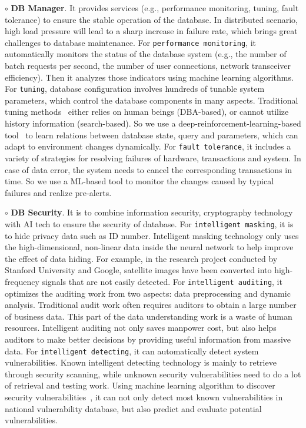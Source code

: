 $\circ$ \textbf{DB Manager}. It provides services (e.g., performance monitoring, tuning, fault tolerance) to ensure the stable operation of the database. In distributed scenario, high load pressure will lead to a sharp increase in failure rate, which brings great challenges to database maintenance. 
For \texttt{performance monitoring}, it automatically monitors the status of the database system (e.g., the number of batch requests per second, the number of user connections, network transceiver efficiency). Then it analyzes those indicators using machine learning algorithms. 
For \texttt{tuning}, database configuration involves hundreds of tunable system parameters, which control the database components in many aspects. Traditional tuning methods~\cite{DBLP:journals/pvldb/DuanTB09, DBLP:conf/cloud/ZhuLGBMLSY17} either relies on human beings (DBA-based), or cannot utilize history information (search-based). So we use a deep-reinforcement-learning-based tool~\cite{DBLP:conf/vldb/qtune19} to learn relations between database state, query and parameters, which can adapt to environment changes dynamically.
For \texttt{fault tolerance}, it includes a variety of strategies for resolving failures of hardware, transactions and system. In case of data error, the system needs to cancel the corresponding transactions in time. So we use a ML-based tool to monitor the changes caused by typical failures and realize pre-alerts. 

$\circ$ \textbf{DB Security}. It is to combine information security, cryptography technology with AI tech to  ensure the security of database. 
For \texttt{intelligent masking}, it is to hide privacy data such as ID number.  Intelligent masking technology only uses the high-dimensional, non-linear data inside the neural network to help improve the effect of data hiding. For example, in the research project conducted by Stanford University and Google, satellite images have been converted into high-frequency signals that are not easily detected. 
For \texttt{intelligent auditing}, it optimizes the auditing work from two aspects: data preprocessing and dynamic analysis. Traditional audit work often requires auditors to obtain a large number of business data. This part of the data understanding work is a waste of human resources. Intelligent auditing not only saves manpower cost, but also helps auditors to make better decisions by providing useful information from massive data.  
For \texttt{intelligent detecting}, it can automatically detect system vulnerabilities. Known intelligent detecting technology is mainly to retrieve through security scanning, while unknown security vulnerabilities need to do a lot of retrieval and testing work.  Using machine learning algorithm to discover security vulnerabilities~\cite{DBLP:journals/corr/abs-1902-10680}, it can not only detect most known vulnerabilities in national vulnerability database, but also predict and evaluate potential vulnerabilities.

